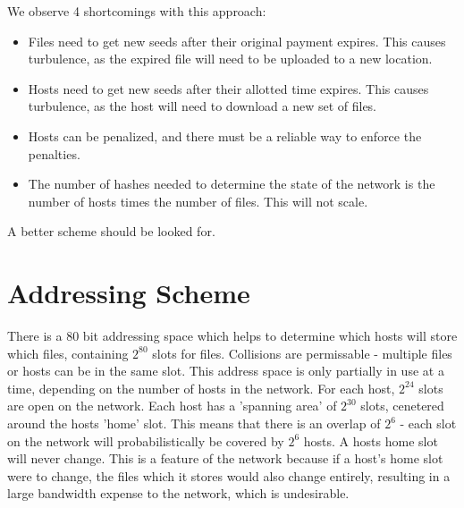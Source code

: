 \documentclass[twocolumn]{article}
\begin{document}
We observe 4 shortcomings with this approach:
\begin{itemize}
	\item Files need to get new seeds after their original payment expires. This causes turbulence, as the expired file will need to be uploaded to a new location.
	\item Hosts need to get new seeds after their allotted time expires. This causes turbulence, as the host will need to download a new set of files.
	\item Hosts can be penalized, and there must be a reliable way to enforce the penalties.
	\item The number of hashes needed to determine the state of the network is the number of hosts times the number of files. This will not scale.
\end{itemize}
A better scheme should be looked for.

\iffalse
\section{Addressing Scheme}
There is a 80 bit addressing space which helps to determine which hosts will store which files, containing $2^{80}$ slots for files.
Collisions are permissable - multiple files or hosts can be in the same slot.
This address space is only partially in use at a time, depending on the number of hosts in the network. For each host, $2^{24}$ slots are open on the network.
Each host has a 'spanning area' of $2^{30}$ slots, cenetered around the hosts 'home' slot. This means that there is an overlap of $2^6$ - each slot on the network will probabilistically be covered by $2^6$ hosts.
A hosts home slot will never change.
This is a feature of the network because if a host's home slot were to change, the files which it stores would also change entirely, resulting in a large bandwidth expense to the network, which is undesirable.
\end{document}
